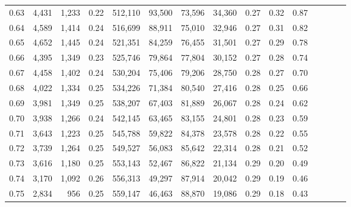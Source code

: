 \begin{tabular}{rrrcrrrrrrrrrrr}
0.63 &   4,431 &  1,233 &                                       0.22 &  512,110 &   93,500 &   73,596 &   34,360 &  0.27 &  0.32 &                         0.87 \\
0.64 &   4,589 &  1,414 &                                       0.24 &  516,699 &   88,911 &   75,010 &   32,946 &  0.27 &  0.31 &                         0.82 \\
0.65 &   4,652 &  1,445 &                                       0.24 &  521,351 &   84,259 &   76,455 &   31,501 &  0.27 &  0.29 &                         0.78 \\
0.66 &   4,395 &  1,349 &                                       0.23 &  525,746 &   79,864 &   77,804 &   30,152 &  0.27 &  0.28 &                         0.74 \\
0.67 &   4,458 &  1,402 &                                       0.24 &  530,204 &   75,406 &   79,206 &   28,750 &  0.28 &  0.27 &                         0.70 \\
0.68 &   4,022 &  1,334 &                                       0.25 &  534,226 &   71,384 &   80,540 &   27,416 &  0.28 &  0.25 &                         0.66 \\
0.69 &   3,981 &  1,349 &                                       0.25 &  538,207 &   67,403 &   81,889 &   26,067 &  0.28 &  0.24 &                         0.62 \\
0.70 &   3,938 &  1,266 &                                       0.24 &  542,145 &   63,465 &   83,155 &   24,801 &  0.28 &  0.23 &                         0.59 \\
0.71 &   3,643 &  1,223 &                                       0.25 &  545,788 &   59,822 &   84,378 &   23,578 &  0.28 &  0.22 &                         0.55 \\
0.72 &   3,739 &  1,264 &                                       0.25 &  549,527 &   56,083 &   85,642 &   22,314 &  0.28 &  0.21 &                         0.52 \\
0.73 &   3,616 &  1,180 &                                       0.25 &  553,143 &   52,467 &   86,822 &   21,134 &  0.29 &  0.20 &                         0.49 \\
0.74 &   3,170 &  1,092 &                                       0.26 &  556,313 &   49,297 &   87,914 &   20,042 &  0.29 &  0.19 &                         0.46 \\
0.75 &   2,834 &    956 &                                       0.25 &  559,147 &   46,463 &   88,870 &   19,086 &  0.29 &  0.18 &                         0.43 \\

\end{tabular}
